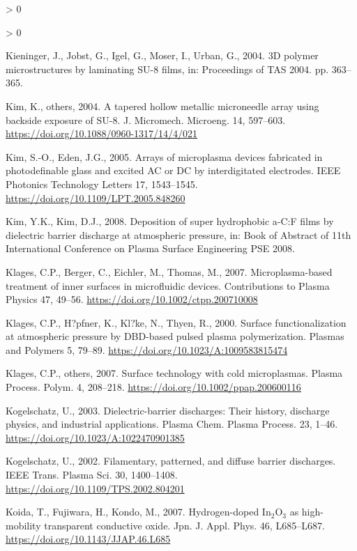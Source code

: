 \documentclass[
  11pt,
  twoside]{article}
\newlength{\cslhangindent}
\newenvironment{CSLReferences}[2] %
 {%
  \setlength{\parindent}{0pt}
  \ifodd #1 \everypar{\setlength{\hangindent}{\cslhangindent}}\ignorespaces\fi
  \ifnum #2 > 0
  \setlength{\parskip}{#2\baselineskip}
  \fi
 }%
 {}
\begin{document}
\begin{CSLReferences}{1}{0}
\begin{CSLReferences}{1}{0}
\leavevmode\hypertarget{ref-Kien04}{}%
Kieninger, J., Jobst, G., Igel, G., Moser, I., Urban, G., 2004. {3D} polymer microstructures by laminating {SU-8} films, in: {Proceedings of {}TAS 2004}. pp. 363--365.

\leavevmode\hypertarget{ref-Kim04}{}%
Kim, K., others, 2004. {A tapered hollow metallic microneedle array using backside exposure of SU-8}. J. Micromech. Microeng. 14, 597--603. \url{https://doi.org/10.1088/0960-1317/14/4/021}

\leavevmode\hypertarget{ref-Kim03}{}%
Kim, S.-O., Eden, J.G., 2005. Arrays of microplasma devices fabricated in photodefinable glass and excited {AC or DC} by interdigitated electrodes. IEEE Photonics Technology Letters 17, 1543--1545. \url{https://doi.org/10.1109/LPT.2005.848260}

\leavevmode\hypertarget{ref-Kim08}{}%
Kim, Y.K., Kim, D.J., 2008. Deposition of super hydrophobic {a-C:F} films by dielectric barrier discharge at atmospheric pressure, in: Book of Abstract of 11th International Conference on Plasma Surface Engineering PSE 2008.

\leavevmode\hypertarget{ref-Klag07-2}{}%
Klages, C.P., Berger, C., Eichler, M., Thomas, M., 2007. Microplasma-based treatment of inner surfaces in microfluidic devices. Contributions to Plasma Physics 47, 49--56. \url{https://doi.org/10.1002/ctpp.200710008}

\leavevmode\hypertarget{ref-Klag00}{}%
Klages, C.P., H?pfner, K., Kl?ke, N., Thyen, R., 2000. Surface functionalization at atmospheric pressure by {DBD}-based pulsed plasma polymerization. Plasmas and Polymers 5, 79--89. \url{https://doi.org/10.1023/A:1009583815474}

\leavevmode\hypertarget{ref-Klag07}{}%
Klages, C.P., others, 2007. Surface technology with cold microplasmas. Plasma Process. Polym. 4, 208--218. \url{https://doi.org/10.1002/ppap.200600116}

\leavevmode\hypertarget{ref-Kogel03}{}%
Kogelschatz, U., 2003. Dielectric-barrier discharges: Their history, discharge physics, and industrial applications. Plasma Chem. Plasma Process. 23, 1--46. \url{https://doi.org/10.1023/A:1022470901385}

\leavevmode\hypertarget{ref-Kogel02}{}%
Kogelschatz, U., 2002. Filamentary, patterned, and diffuse barrier discharges. IEEE Trans. Plasma Sci. 30, 1400--1408. \url{https://doi.org/10.1109/TPS.2002.804201}

\leavevmode\hypertarget{ref-Koid07}{}%
Koida, T., Fujiwara, H., Kondo, M., 2007. Hydrogen-doped \(\mathrm{In_{2}O_{3}}\) as high-mobility transparent conductive oxide. Jpn. J. Appl. Phys. 46, L685--L687. \url{https://doi.org/10.1143/JJAP.46.L685}


\end{CSLReferences}
\end{CSLReferences}
\end{document}

